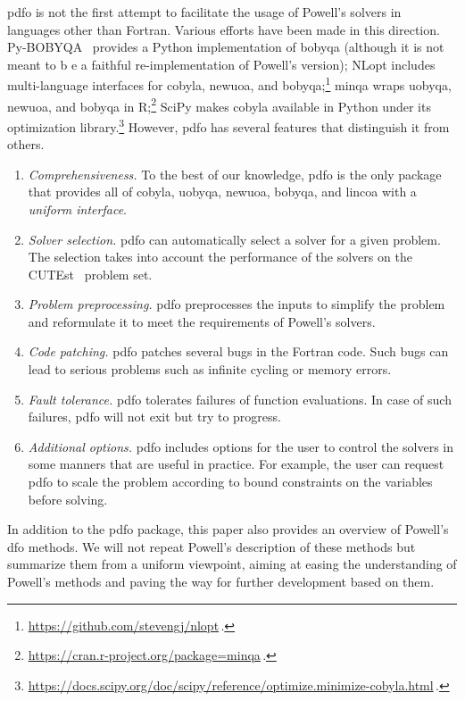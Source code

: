 \documentclass{article}
\numberwithin{equation}{section}
\theoremstyle{definition}
\theoremstyle{plain}
\theoremstyle{remark}
\begin{document}
\Gls{pdfo} is not the first attempt to facilitate the usage of Powell's solvers in languages other than Fortran.
Various efforts have been made in this direction.
Py-BOBYQA~\cite{Cartis_Etal_2019,Cartis_Roberts_Sheridan-Methven_2022} provides a Python implementation of \gls{bobyqa} (although it is not meant to b
e a faithful re-implementation of Powell's version); NLopt includes multi-language interfaces for \gls{cobyla}, \gls{newuoa}, and \gls{bobyqa};\footnote{\url{https://github.com/stevengj/nlopt}\,.} minqa wraps \gls{uobyqa}, \gls{newuoa}, and \gls{bobyqa} in R;\footnote{\url{https://cran.r-project.org/package=minqa}\,.} SciPy makes \gls{cobyla} available in Python under its optimization library.\footnote{\url{https://docs.scipy.org/doc/scipy/reference/optimize.minimize-cobyla.html}\,.}
However, \gls{pdfo} has several features that distinguish it from others.
\begin{enumerate}
    \item \emph{Comprehensiveness.}
        To the best of our knowledge, \gls{pdfo} is the only package that provides all of \gls{cobyla}, \gls{uobyqa}, \gls{newuoa}, \gls{bobyqa}, and \gls{lincoa} with a \emph{uniform interface}.
    \item \emph{Solver selection.}
        \Gls{pdfo} can automatically select a solver for a given problem.
        The selection takes into account the performance of the solvers on the CUTEst~\cite{Gould_Orban_Toint_2015} problem set.
    \item \emph{Problem preprocessing.}
        \Gls{pdfo} preprocesses the inputs to simplify the problem and reformulate it to meet the requirements of Powell's solvers.
    \item \emph{Code patching.}
        \Gls{pdfo} patches several bugs in the Fortran code.
        Such bugs can lead to serious problems such as infinite cycling or memory errors.
    \item \emph{Fault tolerance.}
        \Gls{pdfo} tolerates failures of function evaluations.
        In case of such failures, \gls{pdfo} will not exit but try to progress.
    \item \emph{Additional options.}
        \gls{pdfo} includes options for the user to control the solvers in some manners that are useful in practice.
        For example, the user can request \gls{pdfo} to scale the problem according to bound constraints on the variables before solving.
\end{enumerate}

In addition to the \gls{pdfo} package, this paper also provides an overview of Powell's \gls{dfo} methods.
We will not repeat Powell's description of these methods but summarize them from a uniform viewpoint, aiming at easing the understanding of Powell's methods and paving the way for further development based on them.
\end{document}
